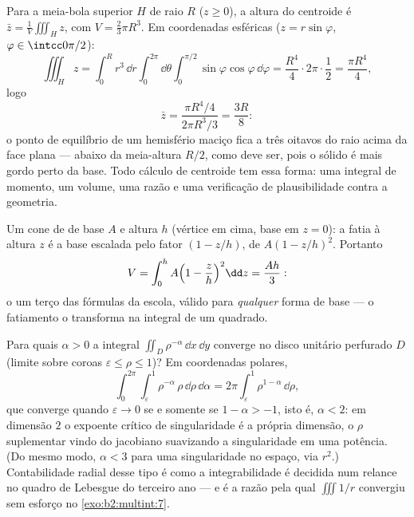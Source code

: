 \begin{example}\label{ex:b2:multint:centroid}
Para a meia-bola superior $H$ de raio $R$ ($z \geq 0$), a
altura do centroide é $\bar z = \frac1{V}\iiint_H z$, com $V =
\frac23\pi R^3$. Em coordenadas esféricas ($z =
r\sin\varphi$, $\varphi \in \intcc0{\pi/2}$):
\[
\iiint_H z
= \int_0^R r^3\,\dd r\int_0^{2\pi}\dd\theta
\int_0^{\pi/2}\sin\varphi\cos\varphi\,\dd\varphi
= \frac{R^4}4\cdot2\pi\cdot\frac12 = \frac{\pi R^4}4 ,
\]
logo
\[
\bar z = \frac{\pi R^4/4}{2\pi R^3/3} = \frac{3R}8 :
\]
o ponto de equilíbrio de um hemisfério maciço fica a três oitavos
do raio acima da face plana --- abaixo da meia-altura
$R/2$, como deve ser, pois o sólido é mais gordo perto da base.
Todo cálculo de centroide tem essa forma: uma integral de
momento, um volume, uma razão e uma verificação de plausibilidade
contra a geometria.
\end{example}

\begin{example}\label{ex:b2:multint:cone}
Um cone de  de base $A$ e altura $h$ (vértice em cima, base em $z = 0$):
a fatia à altura $z$ é a base escalada pelo fator $(1 -
z/h)$, de  $A(1 - z/h)^2$. Portanto
\[
V = \int_0^h A\Bigl(1 - \frac zh\Bigr)^2\dd z = \frac{Ah}{3} :
\]
o um terço das fórmulas da escola, válido para \emph{qualquer} forma
de base --- o fatiamento o transforma na integral de um quadrado.
\end{example}

\begin{example}\label{ex:b2:multint:threshold}
Para quais $\alpha > 0$ a integral $\iint_{D}\rho^{-\alpha}\,\dd
x\,\dd y$ converge no disco unitário perfurado $D$ (limite
sobre coroas $\varepsilon \leq \rho \leq 1$)? Em coordenadas
polares,
\[
\int_0^{2\pi}\!\!\int_\varepsilon^1\rho^{-\alpha}\,
\rho\,\dd\rho\,\dd\alpha
= 2\pi\int_\varepsilon^1\rho^{1-\alpha}\,\dd\rho ,
\]
que converge quando $\varepsilon \to 0$ se e somente se $1 - \alpha > -1$,
isto é, $\alpha < 2$: em dimensão $2$ o expoente crítico de
singularidade é a própria dimensão, o $\rho$ suplementar vindo do
jacobiano suavizando a singularidade em uma potência. (Do mesmo modo,
$\alpha < 3$ para uma singularidade  no espaço, via $r^2$.)
Contabilidade radial desse tipo é como a integrabilidade é
decidida num relance no quadro de Lebesgue do terceiro ano ---
e é a razão pela qual $\iiint 1/r$ convergiu sem esforço no
\cref{exo:b2:multint:7}.
\end{example}

